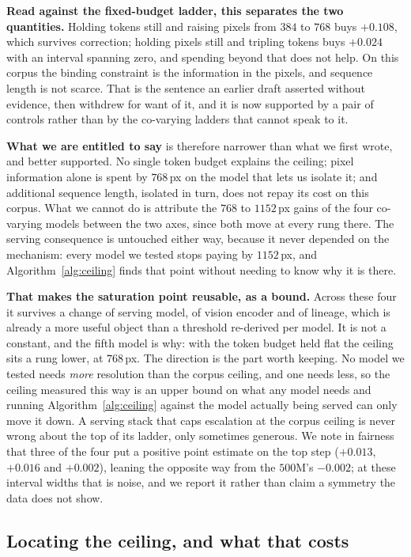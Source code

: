 \documentclass[10pt,twocolumn]{article}
\theoremstyle{plain}
\begin{document}
\textbf{Read against the fixed-budget ladder, this separates the two
quantities.} Holding tokens still and raising pixels from $384$ to $768$ buys
$+0.108$, which survives correction; holding pixels still and tripling tokens
buys $+0.024$ with an interval spanning zero, and spending beyond that does not
help. On this corpus the binding constraint is the information in the pixels,
and sequence length is not scarce. That is the sentence an earlier draft asserted without evidence,
then withdrew for want of it, and it is now supported by a pair of controls
rather than by the co-varying ladders that cannot speak to it.

\textbf{What we are entitled to say} is therefore narrower than what we first
wrote, and better supported. No single token budget explains the ceiling; pixel
information alone is spent by $768$\,px on the model that lets us isolate it;
and additional sequence length, isolated in turn, does not repay its cost on
this corpus. What we cannot do is attribute the $768$ to $1152$\,px gains of
the four co-varying models between the two axes, since both move at every rung
there. The serving consequence is untouched either way, because it never
depended on the mechanism: every model we tested stops paying by $1152$\,px,
and Algorithm~\ref{alg:ceiling} finds that point without needing to know why it is there.

\textbf{That makes the saturation point reusable, as a bound.} Across these
four it survives a change of serving model, of vision encoder and of lineage,
which is already a more useful object than a threshold re-derived per model.
It is not a constant, and the fifth model is why: with the token budget held
flat the ceiling sits a rung lower, at $768$\,px. The direction is the part
worth keeping. No model we tested needs \emph{more} resolution than the corpus
ceiling, and one needs less, so the ceiling measured this way is an upper bound
on what any model needs and running Algorithm~\ref{alg:ceiling} against the model actually
being served can only move it down. A serving stack that caps escalation at the
corpus ceiling is never wrong about the top of its ladder, only sometimes
generous. We note in fairness that three of the four put a positive point
estimate on the top step ($+0.013$, $+0.016$ and $+0.002$), leaning the
opposite way from the $500$M's $-0.002$; at these interval widths that is
noise, and we report it rather than claim a symmetry the data does not show.


\subsection{Locating the ceiling, and what that costs}
\end{document}
